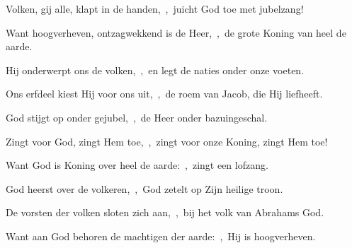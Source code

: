 \documentclass[12pt,twoside,a5paper]{article}
\begin{document}




\begin{halfparskip}
  Volken, gij alle, klapt in de handen,~\sep\ juicht God toe met jubelzang!


  Want hoogverheven, ontzagwekkend is de Heer,~\sep\ de grote Koning van heel de aarde.

  Hij onderwerpt ons de volken,~\sep\ en legt de naties onder onze voeten.

  Ons erfdeel kiest Hij voor ons uit,~\sep\ de roem van Jacob, die Hij liefheeft.
\end{halfparskip}


\begin{halfparskip}
  God stijgt op onder gejubel,~\sep\ de Heer onder bazuingeschal.

  Zingt voor God, zingt Hem toe,~\sep\ zingt voor onze Koning, zingt Hem toe!

  Want God is Koning over heel de aarde:~\sep\ zingt een lofzang.

  God heerst over de volkeren,~\sep\ God zetelt op Zijn heilige troon.

  De vorsten der volken sloten zich aan,~\sep\ bij het volk van Abrahams God.

  Want aan God behoren de machtigen der aarde:~\sep\ Hij is hoogverheven.
\end{halfparskip}


\end{document}
